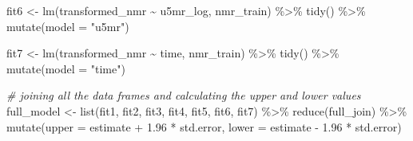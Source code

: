 \documentclass[
]{article}
\newenvironment{Shaded}{\begin{snugshade}}{\end{snugshade}}
\newcommand{\AttributeTok}[1]{\textcolor[rgb]{0.77,0.63,0.00}{#1}}
\newcommand{\CommentTok}[1]{\textcolor[rgb]{0.56,0.35,0.01}{\textit{#1}}}
\newcommand{\FloatTok}[1]{\textcolor[rgb]{0.00,0.00,0.81}{#1}}
\newcommand{\FunctionTok}[1]{\textcolor[rgb]{0.00,0.00,0.00}{#1}}
\newcommand{\NormalTok}[1]{#1}
\newcommand{\OtherTok}[1]{\textcolor[rgb]{0.56,0.35,0.01}{#1}}
\newcommand{\SpecialCharTok}[1]{\textcolor[rgb]{0.00,0.00,0.00}{#1}}
\newcommand{\StringTok}[1]{\textcolor[rgb]{0.31,0.60,0.02}{#1}}
\begin{document}
\begin{Shaded}
\begin{Highlighting}[]
\NormalTok{fit6 }\OtherTok{\textless{}{-}} \FunctionTok{lm}\NormalTok{(transformed\_nmr }\SpecialCharTok{\textasciitilde{}}\NormalTok{ u5mr\_log, nmr\_train) }\SpecialCharTok{\%\textgreater{}\%} 
  \FunctionTok{tidy}\NormalTok{() }\SpecialCharTok{\%\textgreater{}\%} 
  \FunctionTok{mutate}\NormalTok{(}\AttributeTok{model =} \StringTok{"u5mr"}\NormalTok{)}

\NormalTok{fit7 }\OtherTok{\textless{}{-}} \FunctionTok{lm}\NormalTok{(transformed\_nmr }\SpecialCharTok{\textasciitilde{}}\NormalTok{ time, nmr\_train) }\SpecialCharTok{\%\textgreater{}\%} 
  \FunctionTok{tidy}\NormalTok{() }\SpecialCharTok{\%\textgreater{}\%} 
  \FunctionTok{mutate}\NormalTok{(}\AttributeTok{model =} \StringTok{"time"}\NormalTok{)}

\CommentTok{\# joining all the data frames and calculating the upper and lower values}
\NormalTok{full\_model }\OtherTok{\textless{}{-}} \FunctionTok{list}\NormalTok{(fit1, fit2, fit3, fit4, fit5, fit6, fit7) }\SpecialCharTok{\%\textgreater{}\%} 
  \FunctionTok{reduce}\NormalTok{(full\_join) }\SpecialCharTok{\%\textgreater{}\%} 
  \FunctionTok{mutate}\NormalTok{(}\AttributeTok{upper =}\NormalTok{ estimate }\SpecialCharTok{+} \FloatTok{1.96} \SpecialCharTok{*}\NormalTok{ std.error,}
         \AttributeTok{lower =}\NormalTok{ estimate }\SpecialCharTok{{-}} \FloatTok{1.96} \SpecialCharTok{*}\NormalTok{ std.error)}


\end{Highlighting}
\end{Shaded}
\end{document}
